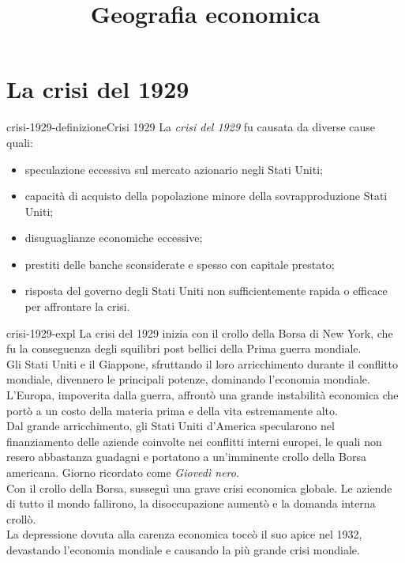 \documentclass[preview]{standalone}
\begin{document}
\title{Geografia economica}
\genpage

\section{La crisi del 1929}

\begin{snippetdefinition}{crisi-1929-definizione}{Crisi 1929}
    La \textit{crisi del 1929} fu causata da diverse cause quali:
    \begin{itemize}
        \item speculazione eccessiva sul mercato azionario negli Stati Uniti;
        \item capacità di acquisto della popolazione minore della sovrapproduzione Stati Uniti;
        \item disuguaglianze economiche eccessive;
        \item prestiti delle banche sconsiderate e spesso con capitale prestato;
        \item risposta del governo degli Stati Uniti non sufficientemente rapida o efficace per affrontare la crisi.
    \end{itemize}
\end{snippetdefinition}

\begin{snippet}{crisi-1929-expl}
    La crisi del 1929 inizia con il crollo della Borsa di New York, che fu la conseguenza degli
    squilibri post bellici della Prima guerra mondiale.
    \\
    Gli Stati Uniti e il Giappone, sfruttando il loro arricchimento durante il conflitto mondiale,
    divennero le principali potenze, dominando l'economia mondiale.
    \\
    L'Europa, impoverita dalla guerra, affrontò una grande instabilità economica che portò a un
    costo della materia prima e della vita estremamente alto.
    \\
    Dal grande arricchimento, gli Stati Uniti d'America specularono nel finanziamento delle aziende
    coinvolte nei conflitti interni europei, le quali non resero abbastanza guadagni e portatono a
    un'imminente crollo della Borsa americana. Giorno ricordato come \textit{Giovedì nero}.
    \\
    Con il crollo della Borsa, susseguì una grave crisi economica globale.
    Le aziende di tutto il mondo fallirono, la disoccupazione aumentò e la domanda interna crollò.
    \\
    La depressione dovuta alla carenza economica toccò il suo apice nel 1932, devastando l'economia
    mondiale e causando la più grande crisi mondiale.
\end{snippet}
\end{document}
